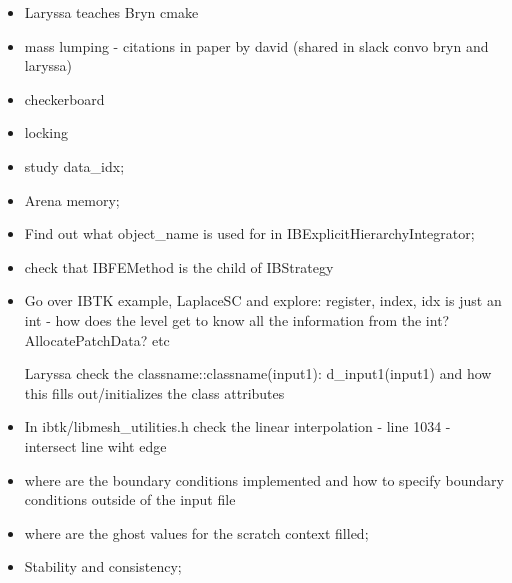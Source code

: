 \documentclass[12pt,a4paper,twoside]{article}
\begin{document}
\begin{itemize}
    \item Laryssa teaches Bryn cmake
    \item mass lumping - citations in paper by david (shared in slack convo bryn and laryssa)
    \item checkerboard
    \item locking
    \item study data\_idx;
    \item Arena memory;
    \item Find out what object\_name is used for in IBExplicitHierarchyIntegrator;
    \item check that IBFEMethod is the child of IBStrategy
    \item Go over IBTK example, LaplaceSC  and explore: register, index, idx is just an int - how does the level get to know all the information from the int? AllocatePatchData?  etc
    \item [Laryssa] check the classname::classname(input1): d\_input1(input1) and how this fills out/initializes the class attributes
    \item In ibtk/libmesh\_utilities.h check the linear interpolation - line 1034 - intersect line wiht edge
    \item where are the boundary conditions implemented and how to specify boundary conditions outside of the input file 
    \item where are the ghost values for the scratch context filled;
    \item Stability and consistency;
\end{itemize}
\end{document}
